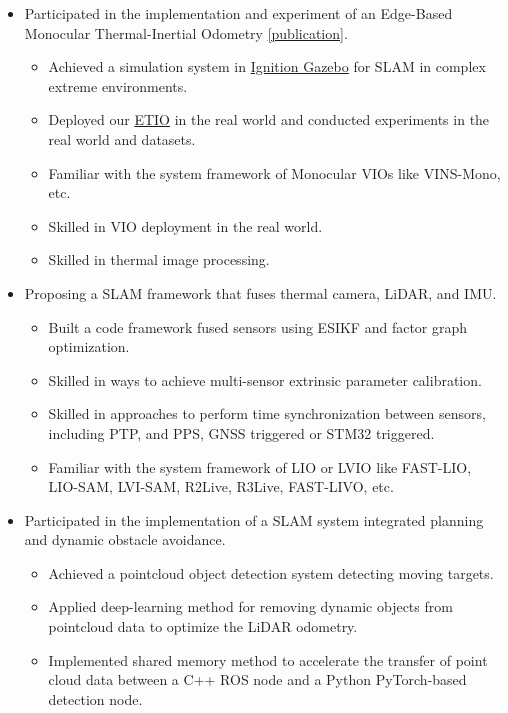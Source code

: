\documentclass[11pt,a4paper]{moderncv}        %
\begin{document}
%
{
\begin{itemize}%
\item Participated in the implementation and experiment of an Edge-Based Monocular Thermal-Inertial Odometry \hyperref[sec:Publications]{[publication]}.
\begin{itemize}%
\hypersetup{urlcolor=black}
\item Achieved a simulation system in \href{https://gazebosim.org/api/gazebo/2.10/index.html}{Ignition Gazebo} for SLAM in complex extreme environments.
\item Deployed our \hyperref[sec:Publications]{ETIO} in the real world and conducted experiments in the real world and datasets.
\item Familiar with the system framework of Monocular VIOs like VINS-Mono, etc.
\item Skilled in  VIO deployment in the real world.
\item Skilled in thermal image processing.
\end{itemize}
\item Proposing a SLAM framework that fuses thermal camera, LiDAR, and IMU.
\begin{itemize}%
\item Built a code framework fused sensors using ESIKF and factor graph optimization. 
\item Skilled in ways to achieve multi-sensor extrinsic parameter calibration.
\item Skilled in approaches to perform time synchronization between sensors, including PTP, and PPS, GNSS triggered or STM32 triggered.
\item Familiar with the system framework of LIO or LVIO like FAST-LIO, LIO-SAM, LVI-SAM, R2Live, R3Live, FAST-LIVO, etc.
\end{itemize}
\item Participated in the implementation of a SLAM system integrated planning and dynamic obstacle avoidance.  
\begin{itemize}%
\item Achieved a pointcloud object detection system detecting moving targets.
\item Applied deep-learning method for removing dynamic objects from pointcloud data to optimize the LiDAR odometry.
\item Implemented shared memory method to accelerate the transfer of point cloud data between a C++ ROS node and a Python PyTorch-based detection node.
\end{itemize}
\end{itemize}
}
\end{document}
